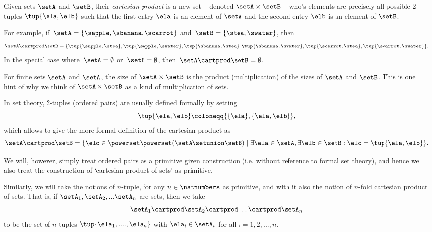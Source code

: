 Given sets $\setA$ and $\setB$, their \emph{cartesian product} is a new set -- denoted $\setA \times \setB$ -- who's elements are precisely all possible 2-tuples $\tup{\ela, \elb}$ such that the first entry $\ela$ is an element of $\setA$ and the second entry $\elb$ is an element of $\setB$. 

For example, if~$\setA = \{ \sapple, \sbanana, \scarrot\}$ and~$\setB = \{ \stea, \swater \}$, then
\begin{equation*}
    \setA \cartprod \setB = \{ \tup{\sapple, \stea}, \tup{\sapple, \swater}, \tup{\sbanana, \stea}, \tup{\sbanana, \swater},  \tup{\scarrot, \stea}, \tup{\scarrot, \swater}\}.
\end{equation*}
In the special case where~$\setA = \emptyset$ or~$\setB = \emptyset$, then~$\setA \cartprod \setB = \emptyset$.


\begin{remark}
For finite sets $\setA$ and $\setA$, the size of $\setA \times \setB$ is the product (multiplication) of the sizes of $\setA$ and $\setB$. This is one hint of why we think of $\setA \times \setB$ as a kind of multiplication of sets. 
\end{remark}

In set theory, 2-tuples (ordered pairs) are usually defined formally by setting
\begin{equation}
    \label{eq:ordered-pair}
    \tup{\ela, \elb} \coloneqq \{ \{\ela \} , \{ \ela, \elb \} \},
\end{equation}
which allows to give the more formal definition of the cartesian product as
            \begin{equation}
                \setA \cartprod \setB = \{ \elc \in \powerset \powerset (\setA \setunion \setB) \mid \exists \ela \in \setA, \exists \elb \in \setB : \elc = \tup{\ela, \elb} \}.
            \end{equation}

We will, however, simply treat ordered pairs as a primitive given construction (i.e. without reference to formal set theory), and hence we also treat the construction of `cartesian product of sets' as primitive. 

Similarly, we will take the notions of $n$-tuple, for any $n \in \natnumbers$ as primitive, and with it also the notion of $n$-fold cartesian product of sets. That is, if $\setA_1, \setA_2, ... \setA_n$ are sets, then we take 
\begin{equation}
\setA_1 \cartprod \setA_2 \cartprod \dots \cartprod \setA_n
\end{equation}
to be the set of $n$-tuples $\tup{\ela_1, ...., \ela_n}$ with $\ela_i \in \setA_i$ for all $i = 1,2,...,n$. 

